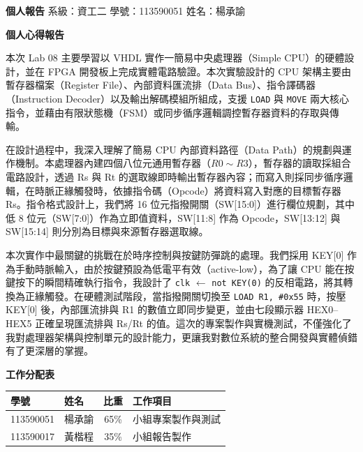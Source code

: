 \documentclass[12pt, a4paper]{article}
\begin{document}
\noindent
\textbf{個人報告} \hfill 系級：資工二 \quad 學號：113590051 \quad 姓名：楊承諭

\vspace{1.5em}
\begin{center}
    {\Large \textbf{個人心得報告}}
\end{center}
\vspace{1em}

本次 Lab 08 主要學習以 VHDL 實作一簡易中央處理器（Simple CPU）的硬體設計，並在 FPGA 開發板上完成實體電路驗證。本次實驗設計的 CPU 架構主要由暫存器檔案（Register File）、內部資料匯流排（Data Bus）、指令譯碼器（Instruction Decoder）以及輸出解碼模組所組成，支援 \texttt{LOAD} 與 \texttt{MOVE} 兩大核心指令，並藉由有限狀態機（FSM）或同步循序邏輯調控暫存器資料的存取與傳輸。

在設計過程中，我深入理解了簡易 CPU 內部資料路徑（Data Path）的規劃與運作機制。本處理器內建四個八位元通用暫存器（$R0\sim R3$），暫存器的讀取採組合電路設計，透過 Rs 與 Rt 的選取線即時輸出暫存器內容；而寫入則採同步循序邏輯，在時脈正緣觸發時，依據指令碼（Opcode）將資料寫入對應的目標暫存器 Rs。指令格式設計上，我們將 16 位元指撥開關（SW[15:0]）進行欄位規劃，其中低 8 位元（SW[7:0]）作為立即值資料，SW[11:8] 作為 Opcode，SW[13:12] 與 SW[15:14] 則分別為目標與來源暫存器選取線。

本次實作中最關鍵的挑戰在於時序控制與按鍵防彈跳的處理。我們採用 KEY[0] 作為手動時脈輸入，由於按鍵預設為低電平有效（active-low），為了讓 CPU 能在按鍵按下的瞬間精確執行指令，我設計了 \texttt{clk} $\leftarrow$ \texttt{not KEY(0)} 的反相電路，將其轉換為正緣觸發。在硬體測試階段，當指撥開關切換至 \texttt{LOAD R1, \#0x55} 時，按壓 KEY[0] 後，內部匯流排與 R1 的數值立即同步變更，並由七段顯示器 HEX0--HEX5 正確呈現匯流排與 Rs/Rt 的值。這次的專案製作與實機測試，不僅強化了我對處理器架構與控制單元的設計能力，更讓我對數位系統的整合開發與實體偵錯有了更深層的掌握。

\vspace{2em}
\noindent
\textbf{工作分配表}
\vspace{0.5em}

\begin{table}[H]
    \centering
    \begin{tabular}{llcl}
        \toprule
        \textbf{學號} & \textbf{姓名} & \textbf{比重} & \textbf{工作項目} \\ \midrule
        113590051 & 楊承諭 & 65\% & 小組專案製作與測試 \\
        113590017 & 黃楷程 & 35\% & 小組報告製作 \\ \bottomrule
    \end{tabular}
\end{table}
\end{document}
